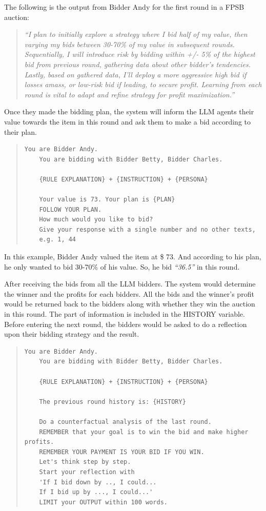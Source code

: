 \documentclass{article} %
\begin{document}
The following is the output from Bidder Andy for the first round in a FPSB auction:
\begin{quote}
\textit{``I plan to initially explore a strategy where I bid half of my value, then varying my bids between 30-70\% of my value in subsequent rounds. Sequentially, I will introduce risk by bidding within +/- 5\% of the highest bid from previous round, gathering data about other bidder's tendencies. Lastly, based on gathered data, I'll deploy a more aggressive high bid if losses amass, or low-risk bid if leading, to secure profit. Learning from each round is vital to adapt and refine strategy for profit maximization.''}
\end{quote}

Once they made the bidding plan, the system will inform the LLM agents their value towards the item in this round and ask them to make a bid according to their plan.
\begin{quote}
\begin{lstlisting}[basicstyle=\ttfamily]
    You are Bidder Andy.            
    You are bidding with Bidder Betty, Bidder Charles.     
    
    {RULE EXPLANATION} + {INSTRUCTION} + {PERSONA} 

    Your value is 73. Your plan is {PLAN}
    FOLLOW YOUR PLAN.
    How much would you like to bid?
    Give your response with a single number and no other texts, 
    e.g. 1, 44
\end{lstlisting}
\end{quote}

In this example, Bidder Andy valued the item at \$ 73. And according to his plan, he only wanted to bid 30-70\% of his value. So, he bid \textit{``36.5''} in this round.

After receiving the bids from all the LLM bidders. The system would determine the winner and the profits for each bidders. All the bids and the winner's profit would be returned back to the bidders along with whether they win the auction in this round. The part of information is included in the HISTORY variable. Before entering the next round, the bidders would be asked to do a reflection upon their bidding strategy and the result.
\begin{quote}
\begin{lstlisting}[basicstyle=\ttfamily]
    You are Bidder Andy.            
    You are bidding with Bidder Betty, Bidder Charles.     
    
    {RULE EXPLANATION} + {INSTRUCTION} + {PERSONA} 

    The previous round history is: {HISTORY}
    
    Do a counterfactual analysis of the last round. 
    REMEMBER that your goal is to win the bid and make higher profits. 
    REMEMBER YOUR PAYMENT IS YOUR BID IF YOU WIN. 
    Let's think step by step. 
    Start your reflection with 
    'If I bid down by .., I could... 
    If I bid up by ..., I could...' 
    LIMIT your OUTPUT within 100 words. 
\end{lstlisting}
\end{quote}
\end{document}
